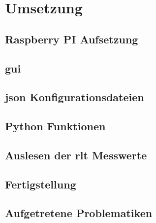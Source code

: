 \ifoot{\pezze}
\chapter{Umsetzung} 

\section{Raspberry PI Aufsetzung}


\newpage
\ifoot{\pezze}
\section{\acf{gui}}\label{gui_design}



\newpage
\ifoot{\pezze}
\section{\acs{json} Konfigurationsdateien}



\newpage
\ifoot{\schneider}


\newpage
\ifoot{\pezze}
\section{Python Funktionen}


\newpage
\ifoot{\schneider}
\section{Auslesen der \acs{rlt} Messwerte}


\section{Fertigstellung}



\newpage
\ifoot{\pezze}



\newpage
\ifoot{\mangeng}
\section{Aufgetretene Problematiken}

